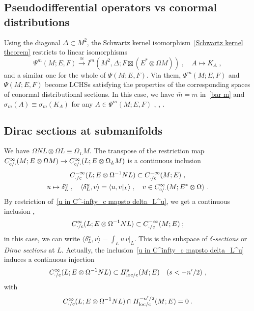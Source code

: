 \documentclass{memo-l}
\theoremstyle{plain}
\theoremstyle{definition}
\theoremstyle{remark}
\newcommand{\co}{{\text{\rm c}}}
\numberwithin{section}{chapter}
\numberwithin{equation}{section}%
\begin{document}
\subsection{Pseudodifferential operators vs conormal distributions}\label{ss: Psi^m vs I^m}

Using the diagonal $\Delta\subset M^2$, the Schwartz kernel isomorphism~\eqref{Schwartz kernel theorem} restricts to linear isomorphisms
\[
\Psi^m(M;E,F)\xrightarrow{\cong}I^m(M^2,\Delta;F\boxtimes(E^*\otimes\Omega M))\;,\quad A\mapsto K_A\;,
\]
and a similar one for the whole of $\Psi(M;E,F)$. Via them, $\Psi^m(M;E,F)$ and $\Psi(M;E,F)$ become LCHSs satisfying the properties of the corresponding spaces of conormal distributional sections. In this case, we have $\bar m=m$ in~\eqref{bar m} and $\sigma_m(A)\equiv\sigma_m(K_A)$ for any $A\in\Psi^m(M;E,F)$ \cite{Hormander1965,KohnNirenberg1965}, \cite[Chapter~XVIII]{Hormander1985-III}, \cite[Chapter~6]{Simanca1990}.






\subsection{Dirac sections at submanifolds}\label{ss: Dirac sections}

We have $\Omega NL\otimes\Omega L\equiv\Omega_LM$. The transpose of the restriction map $C^\infty_{\co/{\cdot}}(M;E\otimes\Omega M)\to C^\infty_{\co/{\cdot}}(L;E\otimes\Omega_LM)$ is a continuous inclusion 
\begin{gather}
C^{-\infty}_{{\cdot}/\co}(L;E\otimes\Omega^{-1}NL)\subset C^{-\infty}_{{\cdot}/\co}(M;E)\;,
\label{u in C^-infty_c mapsto delta_L^u}\\
u\mapsto\delta_L^u\;,\quad\langle\delta_L^u,v\rangle=\langle u,v|_L\rangle\;,\quad 
v\in C^\infty_{\co/{\cdot}}(M;E^*\otimes\Omega)\;.\notag
\end{gather}
By restriction of~\eqref{u in C^-infty_c mapsto delta_L^u}, we get a continuous inclusion \cite[p.~310]{GuilleminSternberg1977},
\begin{equation}\label{u in C^infty_c mapsto delta_L^u}
C^\infty_{{\cdot}/\co}(L;E\otimes\Omega^{-1}NL)\subset C^{-\infty}_{{\cdot}/\co}(M;E)\;;
\end{equation}
in this case, we can write $\langle\delta_L^u,v\rangle=\int_Lu\,v|_L$. This is the subspace of \emph{$\delta$-sections}  or \emph{Dirac sections} at $L$. Actually, the inclusion~\eqref{u in C^infty_c mapsto delta_L^u} induces a continuous injection \cite[Corollary~4.9]{AlvKordyLeichtnam-conormal}
\begin{equation}\label{C^infty_./c(L E otimes Omega^-1 NL) subset H^s_loc/c(M E)}
C^\infty_{{\cdot}/\co}(L;E\otimes\Omega^{-1}NL)\subset H^s_{\text{\rm loc/c}}(M;E)\quad(s<-n'/2)\;,
\end{equation}
with
\[
C^\infty_{{\cdot}/\co}(L;E\otimes\Omega^{-1}NL)\cap H^{-n'/2}_{\text{\rm loc/c}}(M;E)=0\;.
\]
\end{document}
